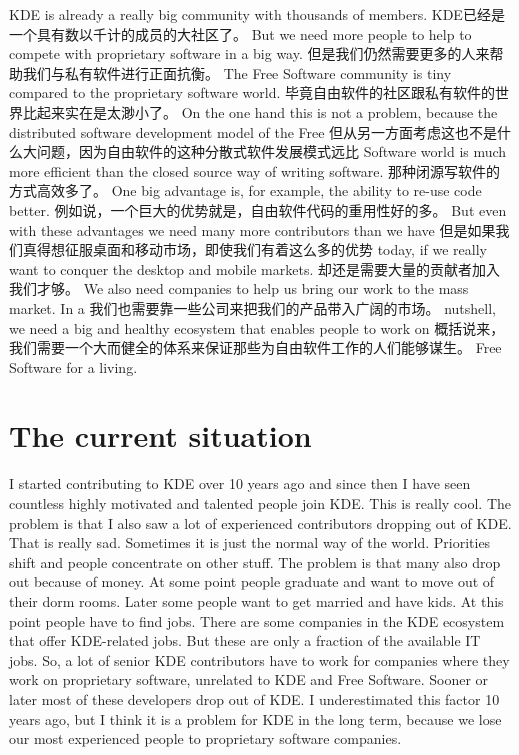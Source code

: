  KDE is already a really big community with thousands of members.
 KDE已经是一个具有数以千计的成员的大社区了。
  But we need more people to help to compete with proprietary software in a big way.
但是我们仍然需要更多的人来帮助我们与私有软件进行正面抗衡。
 The Free Software community is tiny compared to the proprietary software world.
 毕竟自由软件的社区跟私有软件的世界比起来实在是太渺小了。
 On the one hand this is not a problem, because the distributed software development model of the Free
但从另一方面考虑这也不是什么大问题，因为自由软件的这种分散式软件发展模式远比
Software world is much more efficient than the closed source way of writing software.
那种闭源写软件的方式高效多了。
 One big advantage is, for example, the ability to re-use code better.
例如说，一个巨大的优势就是，自由软件代码的重用性好的多。
But even with these advantages we need many more contributors than we have
但是如果我们真得想征服桌面和移动市场，即使我们有着这么多的优势
today, if we really want to conquer the desktop and mobile markets.
却还是需要大量的贡献者加入我们才够。
We also need companies to help us bring our work to the mass market. In a
我们也需要靠一些公司来把我们的产品带入广阔的市场。
nutshell, we need a big and healthy ecosystem that enables people to work on
概括说来，我们需要一个大而健全的体系来保证那些为自由软件工作的人们能够谋生。
Free Software for a living.

\section*{The current situation}

I started contributing to KDE over 10 years ago and since then I have seen
countless highly motivated and talented people join KDE. This is really cool.
The problem is that I also saw a lot of experienced contributors dropping out of
KDE. That is really sad. Sometimes it is just the normal way of the world.
Priorities shift and people concentrate on other stuff. The problem is that many
also drop out because of money. At some point people graduate and want to move
out of their dorm rooms. Later some people want to get married and have kids. At
this point people have to find jobs. There are some companies in the KDE
ecosystem that offer KDE-related jobs. But these are only a fraction of the
available IT jobs. So, a lot of senior KDE contributors have to work for
companies where they work on proprietary software, unrelated to KDE and Free
Software. Sooner or later most of these developers drop out of KDE.
I underestimated this factor 10 years ago, but I think it is a problem for KDE
in the long term, because we lose our most experienced people to proprietary
software companies.

